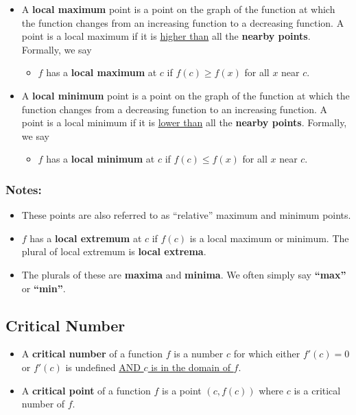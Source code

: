 \begin{tcolorbox}[title = {Local Extreme Points }]
\begin{itemize}[leftmargin=*]
    \item A \textbf{local maximum} point is a point on the graph of the function at which the function changes from an increasing function to a decreasing function. A point is a local maximum if it is \underline{higher than} all the \textbf{nearby points}. Formally, we say
    \begin{itemize}
        \item $f$ has a \textbf{local maximum} at $c$ if $f(c)\ge f(x)$ for all $x$ near $c$.
    \end{itemize}
    \item A \textbf{local minimum} point is a point on the graph of the function at which the function changes from a decreasing function to an increasing function. A point is a local minimum if it is \underline{lower than} all the \textbf{nearby points}. Formally, we say
    \begin{itemize}
        \item $f$ has a \textbf{local minimum} at $c$ if $f(c)\le f(x)$ for all $x$ near $c$.
    \end{itemize}
\end{itemize}
\end{tcolorbox}
\vspace{-0.5cm}
\subsubsection*{Notes:}
\begin{itemize}
    \item These points are also referred to as “relative” maximum and minimum points.
    \item $f$ has a \textbf{local extremum} at $c$ if $f(c)$ is a local maximum or minimum. The plural of local extremum is \textbf{local extrema}.
    \item The plurals of these are \textbf{maxima} and \textbf{minima}. We often simply say \textbf{“max”} or \textbf{“min”}.
\end{itemize}

\subsection*{Critical Number}
\begin{tcolorbox}[title = {Critical Number }]
\begin{itemize}[leftmargin=*]
    \item A \textbf{critical number} of a function $f$ is a number $c$ for which either $f'(c)=0$ or $f'(c)$ is undefined \underline{AND $c$ is in the domain of $f$}.
    \item A \textbf{critical point} of a function $f$ is a point $(c,f(c))$ where $c$ is a critical number of $f$.
\end{itemize}
\end{tcolorbox}
\vspace{-0.5cm}
